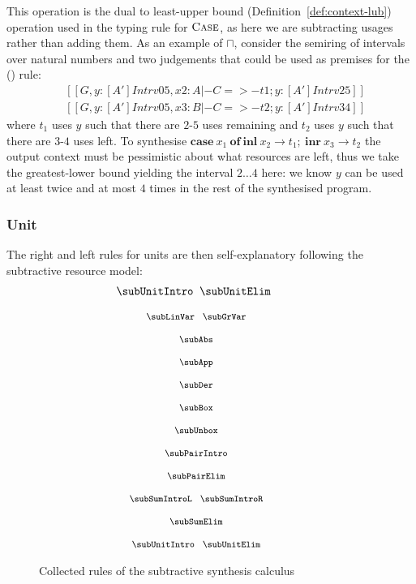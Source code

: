 This operation is the dual to least-upper bound
(Definition~\ref{def:context-lub}) operation used in the typing rule for
$\textsc{Case}$, as here we are subtracting usages rather than adding them. As
an example of $\sqcap$, consider the semiring of intervals over natural numbers
and two judgements that could be used as premises for the (\subSumElimName)
rule:
%
\begin{align*}
& [[ G, y : [A'] Intrv 0 5, x2 : A |- C =>- t1 ; y : [A'] Intrv 2 5 ]] \\
& [[ G, y : [A'] Intrv 0 5, x3 : B |- C =>- t2 ; y : [A'] Intrv 3 4 ]]
\end{align*}
%
where $t_1$ uses $y$ such that there are $2$-$5$ uses remaining
and $t_2$ uses $y$ such that there are $3$-$4$
uses left. To synthesise $\textbf{case} \ x_{1}\ \textbf{of}\ \textbf{inl}\ x_{2} \rightarrow t_{1};\ \textbf{inr}\ x_{3} \rightarrow t_{2}$
the output context must be pessimistic about what resources are left,
thus we take the greatest-lower bound yielding the interval $
2\dots4 $ here: we know $y$ can be used at least twice and at most
$4$ times in the rest of the synthesised program.

\subsubsection{Unit}
The right and left rules for units are then
self-explanatory following the subtractive resource model:
%
\begin{align*}
  \hspace{-3em}
\begin{array}{c}
  \subUnitIntro
  \;\;
  \subUnitElim
\end{array}
\end{align*}


\begin{figure}[t]
\begin{gather*}
{\footnotesize{
  \hspace{-3em}\begin{array}{c}
    \subLinVar
    \;\;\;
    \subGrVar
    \\[1.25em]
    \subAbs
    \\[1.25em]
    \subApp
    \\[1.25em]
    \subDer
    \\[1.25em]
    \subBox
    \\[1.25em]
    \subUnbox
    \\[1.25em]
    \subPairIntro
    \\[1.25em]
    \subPairElim
    \\[1.25em]
    \subSumIntroL
    \;\;\;
    \subSumIntroR
    \\[1.25em]
    \subSumElim
    \\[1.25em]
    \subUnitIntro
    \;\;\;
    \subUnitElim
  \end{array}
}}
\end{gather*}
\caption{Collected rules of the subtractive synthesis calculus}
\label{fig:sub-rules}
  \end{figure}
%

